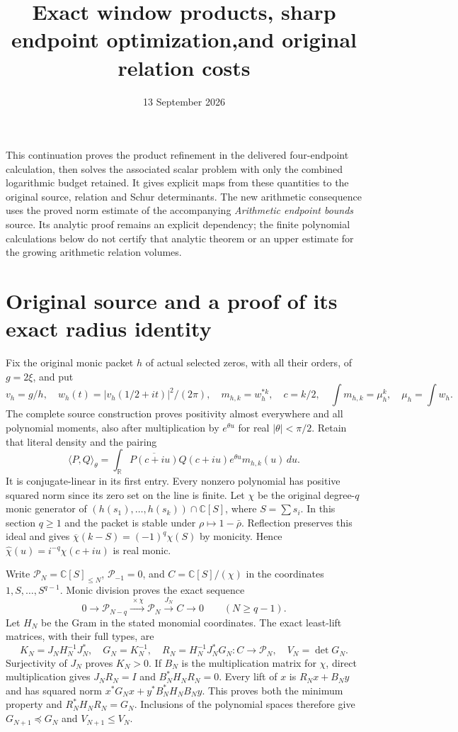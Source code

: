 \documentclass[11pt]{article}
\title{Exact window products, sharp endpoint optimization,\newline and original relation costs}
\author{}\date{13 September 2026}
\newcommand{\C}{\mathbb C}\newcommand{\R}{\mathbb R}
\begin{document}
\maketitle
This continuation proves the product refinement in the delivered
four-endpoint calculation, then solves the associated scalar problem
with only the combined logarithmic budget retained. It gives explicit
maps from these quantities to the original source, relation and Schur
determinants. The new arithmetic consequence uses the proved norm
estimate of the accompanying \emph{Arithmetic endpoint bounds} source.
Its analytic proof remains an explicit dependency; the finite polynomial
calculations below do not certify that analytic theorem or an upper
estimate for the growing arithmetic relation volumes.

\section{Original source and a proof of its exact radius identity}
Fix the original monic packet $h$ of actual selected zeros, with all
their orders, of $g=2\xi$, and put
\[
 v_h=g/h,\quad w_h(t)=|v_h(1/2+it)|^2/(2\pi),\quad
 m_{h,k}=w_h^{*k},\quad c=k/2,
 \quad \int m_{h,k}=\mu_h^k,\quad \mu_h=\int w_h.\tag{EP.1}
\]
The complete source construction proves positivity almost everywhere
and all polynomial moments, also after multiplication by $e^{\theta u}$
for real $|\theta|<\pi/2$. Retain that literal density and the pairing
\[
 \langle P,Q\rangle_\theta=
 \int_\R\overline{P(c+iu)}Q(c+iu)e^{\theta u}m_{h,k}(u)\,du.
 \tag{EP.2}
\]
It is conjugate-linear in its first entry. Every nonzero polynomial has
positive squared norm since its zero set on the line is finite.
Let $\chi$ be the original degree-$q$ monic generator of
$(h(s_1),\ldots,h(s_k))\cap\C[S]$, where $S=\sum s_i$.
In this section $q\ge1$ and the packet is stable under
$\rho\mapsto1-\bar\rho$. Reflection preserves this ideal and gives
$\overline\chi(k-S)=(-1)^q\chi(S)$ by monicity. Hence
$\widehat\chi(u)=i^{-q}\chi(c+iu)$ is real monic.

Write $\mathcal P_N=\C[S]_{\le N}$, $\mathcal P_{-1}=0$, and
$C=\C[S]/(\chi)$ in the coordinates $1,S,\ldots,S^{q-1}$.
Monic division proves the exact sequence
\[
0\longrightarrow\mathcal P_{N-q}\xrightarrow{\,\times\chi\,}
\mathcal P_N\xrightarrow{J_N}C\longrightarrow0\qquad(N\ge q-1).
\tag{EP.3}
\]
Let $H_N$ be the Gram in the stated monomial coordinates. The exact
least-lift matrices, with their full types, are
\[
 K_N=J_NH_N^{-1}J_N^*,\quad G_N=K_N^{-1},\quad
 R_N=H_N^{-1}J_N^*G_N:C\longrightarrow\mathcal P_N,
 \quad V_N=\det G_N.\tag{EP.4}
\]
Surjectivity of $J_N$ proves $K_N>0$. If $B_N$ is the multiplication
matrix for $\chi$, direct multiplication gives $J_NR_N=I$ and
$B_N^*H_NR_N=0$. Every lift of $x$ is $R_Nx+B_Ny$ and has squared
norm $x^*G_Nx+y^*B_N^*H_NB_Ny$. This proves both the minimum
property and $R_N^*H_NR_N=G_N$. Inclusions of the polynomial spaces
therefore give $G_{N+1}\preceq G_N$ and $V_{N+1}\le V_N$.
\end{document}

